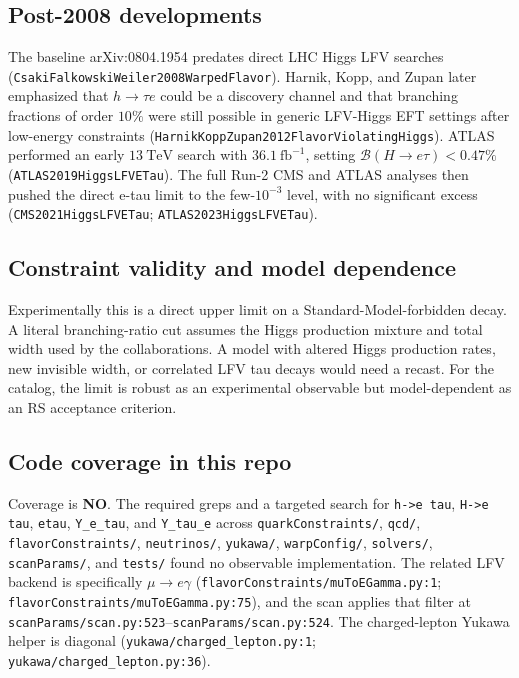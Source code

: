 \subsection*{Post-2008 developments}
The baseline arXiv:0804.1954 predates direct LHC Higgs LFV searches
(\texttt{CsakiFalkowskiWeiler2008WarpedFlavor}).  Harnik, Kopp, and Zupan
later emphasized that \(h\to\tau e\) could be a discovery channel and that
branching fractions of order \(10\%\) were still possible in generic
LFV-Higgs EFT settings after low-energy constraints
(\texttt{HarnikKoppZupan2012FlavorViolatingHiggs}).  ATLAS performed an early
\(13~\mathrm{TeV}\) search with \(36.1~\mathrm{fb}^{-1}\), setting
\(\mathcal{B}(H\to e\tau)<0.47\%\)
(\texttt{ATLAS2019HiggsLFVETau}).  The full Run-2 CMS and ATLAS analyses then
pushed the direct e-tau limit to the few-\(10^{-3}\) level, with no significant
excess (\texttt{CMS2021HiggsLFVETau}; \texttt{ATLAS2023HiggsLFVETau}).

\subsection*{Constraint validity and model dependence}
Experimentally this is a direct upper limit on a Standard-Model-forbidden
decay.  A literal branching-ratio cut assumes the Higgs production mixture
and total width used by the collaborations.  A model with altered Higgs
production rates, new invisible width, or correlated LFV tau decays would need
a recast.  For the catalog, the limit is robust as an experimental observable
but model-dependent as an RS acceptance criterion.

\subsection*{Code coverage in this repo}
Coverage is \textbf{NO}.  The required greps and a targeted search for
\texttt{h->e tau}, \texttt{H->e tau}, \texttt{etau}, \texttt{Y\_e\_tau}, and
\texttt{Y\_tau\_e} across \texttt{quarkConstraints/}, \texttt{qcd/},
\texttt{flavorConstraints/}, \texttt{neutrinos/}, \texttt{yukawa/},
\texttt{warpConfig/}, \texttt{solvers/}, \texttt{scanParams/}, and
\texttt{tests/} found no observable implementation.  The related LFV backend
is specifically \(\mu\to e\gamma\)
(\texttt{flavorConstraints/muToEGamma.py:1};
\texttt{flavorConstraints/muToEGamma.py:75}), and the scan applies that
filter at \texttt{scanParams/scan.py:523}--\texttt{scanParams/scan.py:524}.
The charged-lepton Yukawa helper is diagonal
(\texttt{yukawa/charged\_lepton.py:1}; \texttt{yukawa/charged\_lepton.py:36}).

